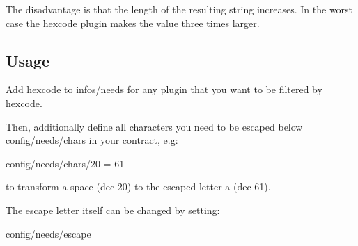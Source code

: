 The disadvantage is that the length of the resulting string increases. In the worst case the hexcode plugin makes the value three times larger.

\subsection*{Usage}

Add {\ttfamily hexcode} to {\ttfamily infos/needs} for any plugin that you want to be filtered by hexcode.

Then, additionally define all characters you need to be escaped below {\ttfamily config/needs/chars} in your contract, e.\+g\+: \begin{DoxyVerb}config/needs/chars/20 = 61
\end{DoxyVerb}


to transform a space (dec 20) to the escaped letter a (dec 61).

The escape letter itself can be changed by setting\+: \begin{DoxyVerb}config/needs/escape\end{DoxyVerb}
 